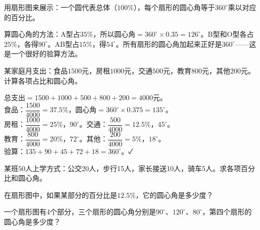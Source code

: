 用扇形图来展示：一个圆代表总体（$100\%$），每个扇形的圆心角等于$360^\circ$乘以对应的百分比。

\begin{center}
\end{center}

算圆心角的方法：A型占$35\%$，所以圆心角$=360^\circ\times0.35=126^\circ$。B型和O型各占$25\%$，各得$90^\circ$。AB型占$15\%$，得$54^\circ$。所有扇形的圆心角加起来正好是$360^\circ$——这是一个很好的验算方法。


\begin{example}
某家庭月支出：食品$1500$元，房租$1000$元，交通$500$元，教育$800$元，其他$200$元。计算各项占比和圆心角。
\end{example}
\begin{solution}
总支出$=1500+1000+500+800+200=4000$元。\\
食品：$\dfrac{1500}{4000}=37.5\%$，圆心角$=360^\circ\times0.375=135^\circ$。\\
房租：$\dfrac{1000}{4000}=25\%$，$90^\circ$。交通：$\dfrac{500}{4000}=12.5\%$，$45^\circ$。\\
教育：$\dfrac{800}{4000}=20\%$，$72^\circ$。其他：$\dfrac{200}{4000}=5\%$，$18^\circ$。\\
验算：$135+90+45+72+18=360^\circ$。✓
\end{solution}

\begin{exercise}
\item 某班$50$人上学方式：公交20人，步行15人，家长接送10人，骑车5人。求各项百分比和圆心角。
\item 在扇形图中，如果某部分的百分比是$12.5\%$，它的圆心角是多少度？
\item 一个扇形图有4个部分，三个扇形的圆心角分别是$90^\circ$、$120^\circ$、$80^\circ$，第四个扇形的圆心角是多少度？
\end{exercise}

